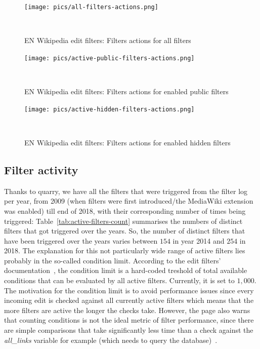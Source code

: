 \begin{figure}
\centering
  \texttt{[image: pics/all-filters-actions.png]}
  \caption{EN Wikipedia edit filters: Filters actions for all filters}~\label{fig:all-filters-actions}
\end{figure}

\begin{figure}
\centering
  \texttt{[image: pics/active-public-filters-actions.png]}
  \caption{EN Wikipedia edit filters: Filters actions for enabled public filters}~\label{fig:active-public-actions}
\end{figure}

\begin{figure}
\centering
  \texttt{[image: pics/active-hidden-filters-actions.png]}
  \caption{EN Wikipedia edit filters: Filters actions for enabled hidden filters}~\label{fig:active-hidden-actions}
\end{figure}


\subsection{Filter activity}

Thanks to quarry, we have all the filters that were triggered from the filter log per year, from 2009 (when filters were first introduced/the MediaWiki extension was enabled) till end of 2018, with their corresponding number of times being triggered:
Table~\ref{tab:active-filters-count} summarises the numbers of distinct filters that got triggered over the years.
So, the number of distinct filters that have been triggered over the years varies between $154$ in year 2014 and $254$ in 2018.
The explanation for this not particularly wide range of active filters lies probably in the so-called condition limit.
According to the edit filters' documentation~\cite{Wikipedia:EditFilterDocumentation}, the condition limit is a hard-coded treshold of total available conditions that can be evaluated by all active filters.
Currently, it is set to $1,000$.
The motivation for the condition limit is to avoid performance issues since every incoming edit is checked against all currently active filters which means that the more filters are active the longer the checks take.
However, the page also warns that counting conditions is not the ideal metric of filter performance, since there are simple comparisons that take significantly less time than a check against the \emph{all\_links} variable for example (which needs to query the database)~\cite{Wikipedia:EditFilterDocumentation}.

